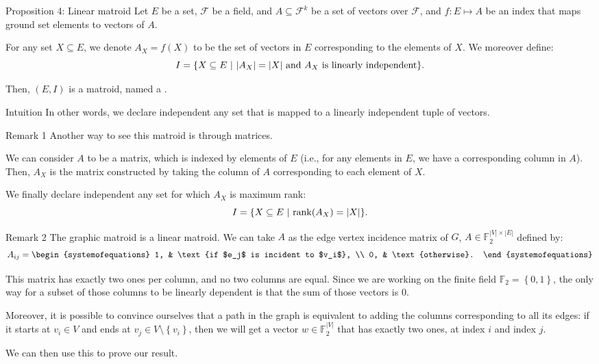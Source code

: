 \documentclass[a4paper]{article}
\begin{document}
\begin{parag}{Proposition 4: Linear matroid}
    Let $E$ be a set, $\mathcal{F}$ be a field, and $A \subseteq \mathcal{F}^k$ be a set of vectors over $\mathcal{F}$, and $f: E \mapsto A$ be an index that maps ground set elements to vectors of $A$.

    For any set $X \subseteq E$, we denote $A_X = f\left(X\right)$ to be the set of vectors in $E$ corresponding to the elements of $X$. We moreover define:
    \[I = \left\{X \subseteq E \suchthat \left|A_X\right| = \left|X\right| \text{ and } A_X \text{ is linearly independent} \right\}.\]

    Then, $\left(E, I\right)$ is a matroid, named a .

    \begin{subparag}{Intuition}
        In other words, we declare independent any set that is mapped to a linearly independent tuple of vectors.
    \end{subparag}

    \begin{subparag}{Remark 1}
        Another way to see this matroid is through matrices.

        We can consider $A$ to be a matrix, which is indexed by elements of $E$ (i.e., for any elements in $E$, we have a corresponding column in $A$). Then, $A_X$ is the matrix constructed by taking the column of $A$ corresponding to each element of $X$.

        We finally declare independent any set for which $A_X$ is maximum rank:
        \[I = \left\{X \subseteq E \suchthat \rank\left(A_X\right) = \left|X\right|\right\}.\]
    \end{subparag}
    
    \begin{subparag}{Remark 2}
        The graphic matroid is a linear matroid. We can take $A$ as the edge vertex incidence matrix of $G$, $A \in \mathbb{F}_2^{\left|V\right| \times \left|E\right|}$ defined by:
        \[A_{ij} = \begin{systemofequations} 1, & \text{if $e_j$ is incident to $v_i$}, \\ 0, & \text{otherwise}. \end{systemofequations}\]

        This matrix has exactly two ones per column, and no two columns are equal. Since we are working on the finite field $\mathbb{F}_2 = \left\{0, 1\right\}$, the only way for a subset of those columns to be linearly dependent is that the sum of those vectors is $0$. 

        Moreover, it is possible to convince ourselves that a path in the graph is equivalent to adding the columns corresponding to all its edges: if it starts at $v_i \in V$ and ends at $v_j \in V \setminus \left\{v_i\right\}$, then we will get a vector $w \in \mathbb{F}_2^{\left|V\right|}$ that has exactly two ones, at index $i$ and index $j$.

        We can then use this to prove our result.
    \end{subparag}
\end{parag}
\end{document}
